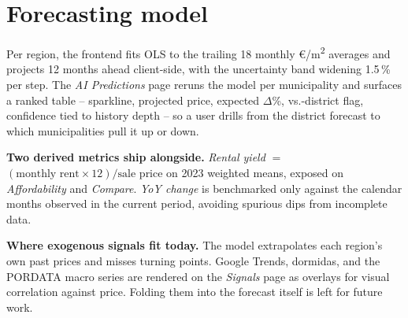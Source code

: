 \documentclass[11pt,a4paper]{article}
\begin{document}
\nocite{arquivo,habitacao,googleTrends,PORDATA,avaliaRepo,avaliaDemo}

\vspace{-2.6em}
\section{Forecasting model}\label{sec:forecast}\label{sec:differentiation}

Per region, the frontend fits OLS to the trailing 18 monthly €/m\textsuperscript{2} averages and projects 12 months ahead client-side, with the uncertainty band widening 1.5\,\% per step. The \emph{AI Predictions} page reruns the model per municipality and surfaces a ranked table -- sparkline, projected price, expected $\Delta$\%, vs.-district flag, confidence tied to history depth -- so a user drills from the district forecast to which municipalities pull it up or down.

\textbf{Two derived metrics ship alongside.} \emph{Rental yield} $=$ $(\text{monthly rent} \times 12) / \text{sale price}$ on 2023 weighted means, exposed on \emph{Affordability} and \emph{Compare}. \emph{YoY change} is benchmarked only against the calendar months observed in the current period, avoiding spurious dips from incomplete data.

\textbf{Where exogenous signals fit today.} The model extrapolates each region's own past prices and misses turning points. Google Trends, dormidas, and the PORDATA macro series are rendered on the \emph{Signals} page as overlays for visual correlation against price. Folding them into the forecast itself is left for future work.
\end{document}
